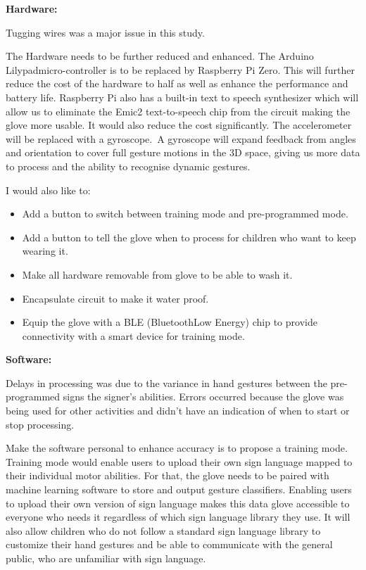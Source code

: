 \textbf{Hardware:} 

Tugging wires was a major issue in this study. 

The Hardware needs to be further reduced and enhanced. The Arduino Lilypad\texttrademark micro-controller is to be replaced by Raspberry Pi Zero. This will further reduce the cost of the hardware to half as well as enhance the performance and battery life. Raspberry Pi also has a built-in text to speech synthesizer which will allow us to eliminate the Emic2 text-to-speech chip from the circuit making the glove more usable. It would also reduce the cost significantly. The accelerometer will be replaced with a gyroscope. A gyroscope will expand feedback from angles and orientation to cover full gesture motions in the 3D space, giving us more data to process and the ability to recognise dynamic gestures. 

I would also like to:
\begin{itemize}
    \item Add a button to switch between training mode and pre-programmed mode. 
    \item Add a button to tell the glove when to process for children who want to keep wearing it. 
    \item Make all hardware removable from glove to be able to wash it. 
    \item Encapsulate circuit to make it water proof. 
    \item Equip the glove with a BLE (Bluetooth\texttrademark Low Energy) chip to provide connectivity with a smart device for training mode. 
\end{itemize}

\textbf{Software:}

Delays in processing was due to the variance in hand gestures between the pre-programmed signs the signer's abilities. Errors occurred because the glove was being used for other activities and didn't have an indication of when to start or stop processing. 

Make the software personal to enhance accuracy is to propose a training mode. Training mode would enable users to upload their own sign language mapped to their individual motor abilities. For that, the glove needs to be paired with machine learning software to store and output gesture classifiers. Enabling users to upload their own version of sign language makes this data glove accessible to everyone who needs it regardless of which sign language library they use. It will also allow children who do not follow a standard sign language library to customize their hand gestures and be able to communicate with the general public, who are unfamiliar with sign language. 

